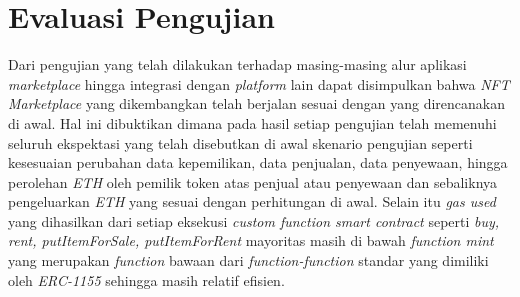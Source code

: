 \section{Evaluasi Pengujian}
\label{sec:analisispengujian}

Dari pengujian yang telah dilakukan terhadap masing-masing alur aplikasi \emph{marketplace} hingga integrasi dengan \emph{platform} lain dapat disimpulkan bahwa \emph{NFT Marketplace} yang dikembangkan telah berjalan sesuai dengan yang direncanakan di awal. Hal ini dibuktikan dimana pada hasil setiap pengujian telah memenuhi seluruh ekspektasi yang telah disebutkan di awal skenario pengujian seperti kesesuaian perubahan data kepemilikan, data penjualan, data penyewaan, hingga perolehan \emph{ETH} oleh pemilik token atas penjual atau penyewaan dan sebaliknya pengeluarkan \emph{ETH} yang sesuai dengan perhitungan di awal. Selain itu \emph{gas used} yang dihasilkan dari setiap eksekusi \emph{custom function smart contract} seperti \emph{buy, rent, putItemForSale, putItemForRent} mayoritas masih di bawah \emph{function mint} yang merupakan \emph{function} bawaan dari \emph{function-function} standar yang dimiliki oleh \emph{ERC-1155} sehingga masih relatif efisien. 
